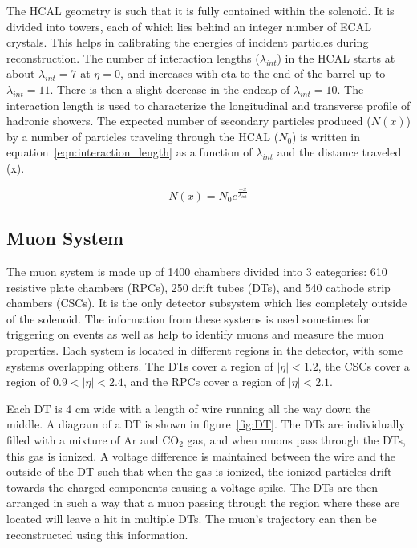 The HCAL geometry is such that it is fully contained within the solenoid.
It is divided into towers, each of which lies behind an integer number of ECAL crystals.
This helps in calibrating the energies of incident particles during reconstruction.
The number of interaction lengths ($\lambda_{int}$) in the HCAL starts at about $\lambda_{int} = 7$ at $\eta = 0$, and increases with eta to the end of the barrel up to $\lambda_{int} = 11$.
There is then a slight decrease in the endcap of $\lambda_{int} = 10$.
The interaction length is used to characterize the longitudinal and transverse profile of hadronic showers.
The expected number of secondary particles produced ($N(x)$)
by a number of particles traveling through the HCAL ($N_{0}$)
is written in equation~\ref{eqn:interaction_length} as a function of $\lambda_{int}$ and the distance traveled (x).

\begin{equation}
  \label{eqn:interaction_length}
  N(x) = N_{0}e^{\frac{-x}{\lambda_{int}}}  
\end{equation}

\subsection{Muon System}
\label {subs:MUON}
The muon system is made up of 1400 chambers divided into 3 categories: 610 resistive plate chambers (RPCs), 250 drift tubes (DTs), and 540 cathode strip chambers (CSCs).
It is the only detector subsystem which lies completely outside of the solenoid.
The information from these systems is used sometimes for triggering on events as well as help to identify muons and measure the muon properties.
Each system is located in different regions in the detector, with some systems overlapping others.
The DTs cover a region of $|\eta| < 1.2$, the CSCs cover a region of $0.9 < |\eta| < 2.4$, and the RPCs cover a region of $|\eta| < 2.1$.

Each DT is 4 cm wide with a length of wire running all the way down the middle.
A diagram of a DT is shown in figure~\ref{fig:DT}.
The DTs are individually filled with a mixture of Ar and $\mathrm{CO_{2}}$ gas, and when muons pass through the DTs, this gas is ionized.
A voltage difference is maintained between the wire and the outside of the DT such that when the gas is ionized,
the ionized particles drift towards the charged components causing a voltage spike.
The DTs are then arranged in such a way that a muon passing through the region where these are located will leave a hit in multiple DTs.
The muon's trajectory can then be reconstructed using this information.

